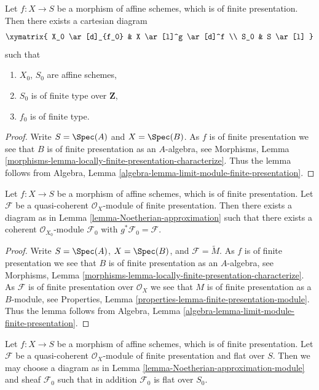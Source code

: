 \begin{lemma}
\label{lemma-Noetherian-approximation}
Let $f : X \to S$ be a morphism of affine schemes, which is of finite
presentation. Then there exists a cartesian diagram
$$
\xymatrix{
X_0 \ar[d]_{f_0} & X \ar[l]^g \ar[d]^f \\
S_0 & S \ar[l]
}
$$
such that
\begin{enumerate}
\item $X_0$, $S_0$ are affine schemes,
\item $S_0$ is of finite type over $\mathbf{Z}$,
\item $f_0$ is of finite type.
\end{enumerate}
\end{lemma}

\begin{proof}
Write $S = \Spec(A)$ and $X = \Spec(B)$.
As $f$ is of finite presentation we see that
$B$ is of finite presentation as an $A$-algebra, see
Morphisms,
Lemma \ref{morphisms-lemma-locally-finite-presentation-characterize}.
Thus the lemma follows from
Algebra, Lemma \ref{algebra-lemma-limit-module-finite-presentation}.
\end{proof}

\begin{lemma}
\label{lemma-Noetherian-approximation-module}
Let $f : X \to S$ be a morphism of affine schemes, which is of finite
presentation. Let $\mathcal{F}$ be a quasi-coherent $\mathcal{O}_X$-module
of finite presentation. Then there exists a diagram as in
Lemma \ref{lemma-Noetherian-approximation}
such that there exists a coherent $\mathcal{O}_{X_0}$-module $\mathcal{F}_0$
with $g^*\mathcal{F}_0 = \mathcal{F}$.
\end{lemma}

\begin{proof}
Write $S = \Spec(A)$, $X = \Spec(B)$, and
$\mathcal{F} = \widetilde{M}$. As $f$ is of finite presentation we see that
$B$ is of finite presentation as an $A$-algebra, see
Morphisms,
Lemma \ref{morphisms-lemma-locally-finite-presentation-characterize}.
As $\mathcal{F}$ is of finite presentation over $\mathcal{O}_X$ we see that
$M$ is of finite presentation as a $B$-module, see
Properties, Lemma \ref{properties-lemma-finite-presentation-module}.
Thus the lemma follows from
Algebra, Lemma \ref{algebra-lemma-limit-module-finite-presentation}.
\end{proof}

\begin{lemma}
\label{lemma-Noetherian-approximation-flat-module}
Let $f : X \to S$ be a morphism of affine schemes, which is of finite
presentation. Let $\mathcal{F}$ be a quasi-coherent $\mathcal{O}_X$-module
of finite presentation and flat over $S$. Then we may choose a diagram as in
Lemma \ref{lemma-Noetherian-approximation-module}
and sheaf $\mathcal{F}_0$ such that in addition $\mathcal{F}_0$
is flat over $S_0$.
\end{lemma}

